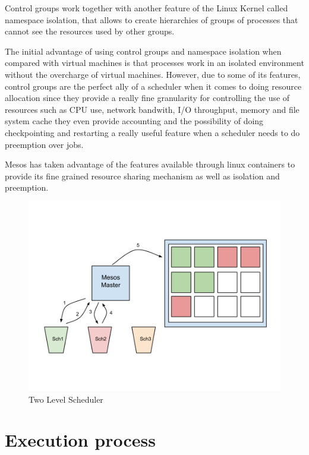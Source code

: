 \documentclass{report}                     %
\begin{document}
Control groups work together with another feature of the Linux Kernel
called namespace isolation, that allows to create hierarchies of
groups of processes that cannot see the resources used by other
groups.

The initial advantage of using control groups and namespace isolation when
compared with virtual machines is that processes work in an isolated
environment without the overcharge of virtual machines. However, due
to some of its features, control groups are the perfect ally of a
scheduler when it comes to doing resource allocation since they provide
a really fine granularity for controlling the use of resources such
as CPU use, network bandwith, I/O throughput, memory and file system 
cache they even provide accounting and the possibility of doing
checkpointing and restarting a really useful feature when a scheduler
needs to do preemption over jobs.

Mesos has taken advantage of the features available through linux containers
\cite{_linux_????} to provide its fine grained resource sharing
mechanism as well as isolation and preemption.

\begin{figure}[!ht]
  \centering
  \includegraphics[scale=0.25,natwidth=960,natheight=720]{TwoLevel.png}
  \caption{Two Level Scheduler}
  \label{fig:two_level}
\end{figure}


\section{Execution process}
\end{document}
